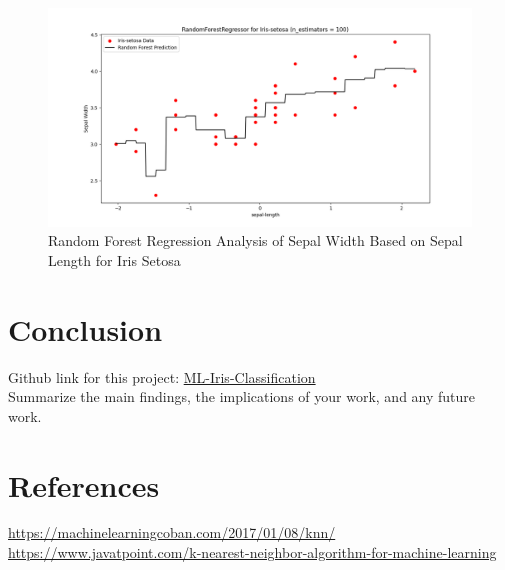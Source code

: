 \documentclass[a4paper]{article}
\begin{document}
\begin{enumerate}
\begin{figure}[h]
	\centering
	\includegraphics[width=1\textwidth]{picture/RF5}
	\caption{Random Forest Regression Analysis of Sepal Width Based on Sepal Length for Iris Setosa}
	\label{fig:iris_setosa_regression}
\end{figure}
\end{enumerate}
\newpage
\section{Conclusion}
Github link for this project:
\href{https://github.com/illubaby/ML-Iris-Classification}{ML-Iris-Classification}\\
Summarize the main findings, the implications of your work, and any future work.

\section{References}
\href{https://machinelearningcoban.com/2017/01/08/knn/}{https://machinelearningcoban.com/2017/01/08/knn/}\\
\href{https://www.javatpoint.com/k-nearest-neighbor-algorithm-for-machine-learning}{https://www.javatpoint.com/k-nearest-neighbor-algorithm-for-machine-learning}
\end{document}
